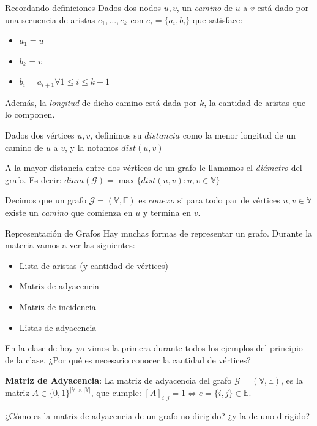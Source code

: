 \documentclass[10pt, aspectratio=169]{beamer}
\begin{document}
\begin{frame}{Recordando definiciones}
	Dados dos nodos $u,v$, un \textit{camino} de $u$ a $v$ est\'a dado por una secuencia de aristas $e_1, \dots, e_k$ con $e_i = \{a_i,b_i\}$ que satisface:
	\begin{itemize}
		\item $a_1 = u$
		\item $b_k = v$
		\item $b_i = a_{i+1} \forall 1 \leq i \leq k-1$
	\end{itemize}
	
	Adem\'as, la \textit{longitud} de dicho camino est\'a dada por $k$, la cantidad de aristas que lo componen.
	
	Dados dos v\'ertices $u,v$, definimos su $\textit{distancia}$ como la menor longitud de un camino de $u$ a $v$, y la notamos $dist(u,v)$
	
	A la mayor distancia entre dos v\'ertices de un grafo le llamamos el \textit{di\'ametro} del grafo. Es decir: $diam(\mathcal{G}) = \max \{dist(u,v) : u,v \in \mathbb{V} \}$
	\pause	
	
	Decimos que un grafo $\mathcal{G} = (\mathbb{V},\mathbb{E})$ es $\textit{conexo}$ si para todo par de v\'ertices $u,v \in \mathbb{V}$ existe un \textit{camino} que comienza en $u$ y termina en $v$.
\end{frame}

\begin{frame}{Representaci\'on de Grafos}
	Hay muchas formas de representar un grafo. Durante la materia vamos a ver las siguientes:
	\begin{itemize}
		\item Lista de aristas (y cantidad de v\'ertices)
		\item Matriz de adyacencia
		\item Matriz de incidencia
		\item Listas de adyacencia
	\end{itemize}
	
	En la clase de hoy ya vimos la primera durante todos los ejemplos del principio de la clase. ¿Por qu\'e es necesario conocer la cantidad de v\'ertices? 
	\pause
	
	\textbf{Matriz de Adyacencia}: La matriz de adyacencia del grafo $\mathcal{G} = (\mathbb{V},\mathbb{E})$, es la matriz $A \in \{0,1\}^{|\mathbb{V}|\times|\mathbb{V}|}$, que cumple: $[A]_{i,j} = 1 \iff e = \{i,j\} \in \mathbb{E}$.
	
	¿C\'omo es la matriz de adyacencia de un grafo no dirigido? ¿y la de uno dirigido?
	
	
\end{frame}
\end{document}
